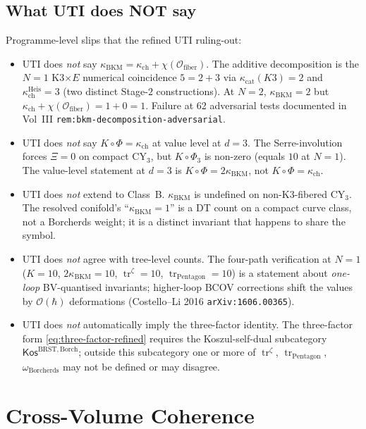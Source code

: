 \documentclass[11pt]{article}
\theoremstyle{definition}
\newcommand{\kch}{\kappa_{\mathrm{ch}}}
\newcommand{\kcat}{\kappa_{\mathrm{cat}}}
\newcommand{\kBKM}{\kappa_{\mathrm{BKM}}}
\newcommand{\BRST}{\mathrm{BRST}}
\newcommand{\tr}{\operatorname{tr}}
\begin{document}
\subsection{What UTI does NOT say}

Programme-level slips that the refined UTI ruling-out:

\begin{itemize}
\item UTI does \emph{not} say $\kBKM = \kch + \chi(\mathcal{O}_{\mathrm{fiber}})$.
The additive decomposition is the $N = 1$ K3$\times E$ numerical
coincidence $5 = 2 + 3$ via $\kcat(K3) = 2$ and $\kch^{\mathrm{Heis}} = 3$
(two distinct Stage-$2$ constructions). At $N = 2$, $\kBKM = 2$ but
$\kch + \chi(\mathcal{O}_{\mathrm{fiber}}) = 1 + 0 = 1$. Failure at 62
adversarial tests documented in Vol~III
\texttt{rem:bkm-decomposition-adversarial}.

\item UTI does \emph{not} say $K \circ \Phi = \kch$ at value level at
$d = 3$. The Serre-involution forces $\Xi = 0$ on compact CY$_3$, but
$K \circ \Phi_3$ is non-zero (equals $10$ at $N = 1$). The value-level
statement at $d = 3$ is $K \circ \Phi = 2 \kBKM$, not $K \circ \Phi = \kch$.

\item UTI does \emph{not} extend to Class~B. $\kBKM$ is undefined on
non-K3-fibered CY$_3$. The resolved conifold's ``$\kBKM = 1$'' is a
DT count on a compact curve class, not a Borcherds weight; it is a
distinct invariant that happens to share the symbol.

\item UTI does \emph{not} agree with tree-level counts. The four-path
verification at $N = 1$ ($K = 10$, $2 \kBKM = 10$, $\tr^{\zeta} = 10$,
$\tr_{\mathrm{Pentagon}} = 10$) is a statement about \emph{one-loop}
BV-quantised invariants; higher-loop BCOV corrections shift the values
by $\mathcal{O}(\hbar)$ deformations (Costello--Li 2016
\texttt{arXiv:1606.00365}).

\item UTI does \emph{not} automatically imply the three-factor identity.
The three-factor form \eqref{eq:three-factor-refined} requires the
Koszul-self-dual subcategory $\mathsf{Kos}^{\BRST,\mathrm{Borch}}$; outside
this subcategory one or more of $\tr^{\zeta}$, $\tr_{\mathrm{Pentagon}}$,
$\omega_{\mathrm{Borcherds}}$ may not be defined or may disagree.
\end{itemize}

\section{Cross-Volume Coherence}
\label{sec:crossvol}
\end{document}
